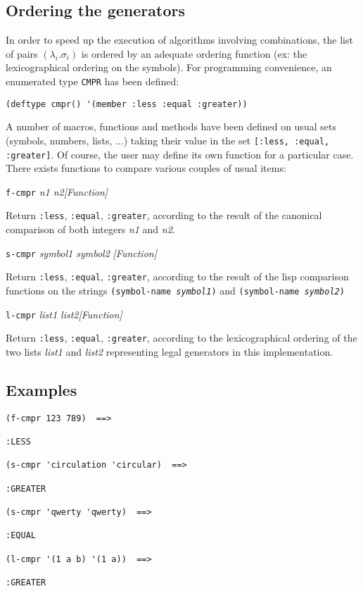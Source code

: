\subsection {Ordering the generators}

In order to speed up the execution of algorithms involving combinations,
the list of pairs $(\lambda_i.\sigma_i)$ is ordered by an adequate ordering function (ex: the  lexicographical ordering
on the symbols). For programming convenience, an enumerated type {\tt CMPR} has been defined:
{\footnotesize\begin{verbatim}
(deftype cmpr() '(member :less :equal :greater))
\end{verbatim}}
A number of macros, functions and methods have been defined
on usual sets (symbols, numbers, lists, ...) taking their value in the set
{\tt [:less, :equal, :greater]}. Of course, the user may define its own function for a particular case.
There exists functions to compare various couples of usual items:
\vskip 0.45cm
{\parindent=0mm
{\leftskip=5mm
{\tt f-cmpr} {\em n1 n2}\hfill {\em [Function]} \par}
{\leftskip=12mm
Return {\tt :less}, {\tt :equal}, {\tt :greater}, according to the result of
the canonical comparison of both integers {\em n1} and {\em n2}. \par}
{\leftskip=5mm
{\tt s-cmpr} {\em symbol1 symbol2} \hfill {\em [Function]}\par}
{\leftskip=12mm
Return  {\tt :less}, {\tt :equal}, {\tt :greater}, according to the result of
the lisp comparison functions on the strings {\tt (symbol-name {\em symbol1})}
and {\tt (symbol-name {\em symbol2})} \par}
{\leftskip=5mm
{\tt l-cmpr} {\em list1 list2}\hfill {\em [Function]} \par}
{\leftskip=12mm
Return  {\tt :less}, {\tt :equal}, {\tt :greater}, according to the
lexicographical ordering of the two lists  {\em list1}
and {\em list2} representing legal generators in this implementation. \par}
}

\subsection* {Examples}

{\footnotesize\begin{verbatim}
(f-cmpr 123 789)  ==>

:LESS

(s-cmpr 'circulation 'circular)  ==>

:GREATER

(s-cmpr 'qwerty 'qwerty)  ==>

:EQUAL

(l-cmpr '(1 a b) '(1 a))  ==>

:GREATER
\end{verbatim}}
\newpage

